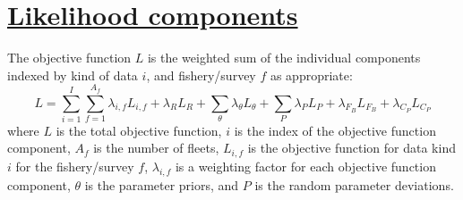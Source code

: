\hypertarget{LikeComp}{}
\section[Likelihood components]{\protect\hyperlink{LikeComp}{Likelihood components}}

The objective function $L$ is the weighted sum of the individual components
indexed by kind of data $i$, and fishery/survey $f$ as appropriate:
\begin{equation}
	L = \sum_{i=1}^{I}\sum_{f=1}^{A_f}\lambda_{i,f} L_{i,f}+\lambda_R L_R + 
	  \sum_{\theta}^{}\lambda_\theta L_\theta + \sum_{P}^{}\lambda_P L_P +
	  \lambda_{F_B} L_{F_B} + \lambda_{C_P} L_{C_P}
\end{equation}
where $L$ is the total objective function, $i$ is the index of the objective
function component, $A_f$ is the number of fleets, $L_{i,f}$ is the
objective function for data kind $i$ for the fishery/survey $f$,
$\lambda_{i,f}$ is a weighting factor for each objective function component,
$\theta$ is the parameter priors, and $P$ is the random parameter deviations.

